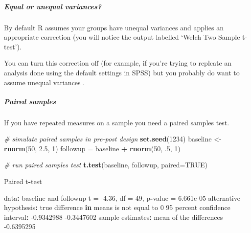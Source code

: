 \documentclass[]{article}
\newenvironment{Shaded}{\begin{snugshade}}{\end{snugshade}}
\newcommand{\CommentTok}[1]{\textcolor[rgb]{0.56,0.35,0.01}{\textit{#1}}}
\newcommand{\ControlFlowTok}[1]{\textcolor[rgb]{0.13,0.29,0.53}{\textbf{#1}}}
\newcommand{\DataTypeTok}[1]{\textcolor[rgb]{0.13,0.29,0.53}{#1}}
\newcommand{\DecValTok}[1]{\textcolor[rgb]{0.00,0.00,0.81}{#1}}
\newcommand{\FloatTok}[1]{\textcolor[rgb]{0.00,0.00,0.81}{#1}}
\newcommand{\KeywordTok}[1]{\textcolor[rgb]{0.13,0.29,0.53}{\textbf{#1}}}
\newcommand{\NormalTok}[1]{#1}
\newcommand{\OperatorTok}[1]{\textcolor[rgb]{0.81,0.36,0.00}{\textbf{#1}}}
\newcommand{\OtherTok}[1]{\textcolor[rgb]{0.56,0.35,0.01}{#1}}
\newcommand{\StringTok}[1]{\textcolor[rgb]{0.31,0.60,0.02}{#1}}
\let\oldsubparagraph\subparagraph
\renewcommand{\subparagraph}[1]{\oldsubparagraph{#1}\mbox{}}
\begin{document}
\hypertarget{equal-variances}{%
\subparagraph{Equal or unequal variances?}\label{equal-variances}}

By default R assumes your groups have unequal variances and applies an
appropriate correction (you will notice the output labelled `Welch Two Sample
t-test').

You can turn this correction off (for example, if you're trying to replcate an
analysis done using the default settings in SPSS) but you probably do want to
assume unequal variances \citep[see][]{ruxton2006unequal}.

\hypertarget{paired-samples}{%
\subparagraph{Paired samples}\label{paired-samples}}

If you have repeated measures on a sample you need a paired samples test.

\begin{Shaded}
\begin{Highlighting}[]
\CommentTok{# simulate paired samples in pre-post design}
\KeywordTok{set.seed}\NormalTok{(}\DecValTok{1234}\NormalTok{)}
\NormalTok{baseline <-}\StringTok{ }\KeywordTok{rnorm}\NormalTok{(}\DecValTok{50}\NormalTok{, }\FloatTok{2.5}\NormalTok{, }\DecValTok{1}\NormalTok{)}
\NormalTok{followup =}\StringTok{ }\NormalTok{baseline }\OperatorTok{+}\StringTok{ }\KeywordTok{rnorm}\NormalTok{(}\DecValTok{50}\NormalTok{, }\FloatTok{.5}\NormalTok{, }\DecValTok{1}\NormalTok{)}

\CommentTok{# run paired samples test}
\KeywordTok{t.test}\NormalTok{(baseline, followup, }\DataTypeTok{paired=}\OtherTok{TRUE}\NormalTok{)}

\NormalTok{    Paired t}\OperatorTok{-}\NormalTok{test}

\NormalTok{data}\OperatorTok{:}\StringTok{  }\NormalTok{baseline and followup}
\NormalTok{t =}\StringTok{ }\FloatTok{-4.36}\NormalTok{, df =}\StringTok{ }\DecValTok{49}\NormalTok{, p}\OperatorTok{-}\NormalTok{value =}\StringTok{ }\FloatTok{6.661e-05}
\NormalTok{alternative hypothesis}\OperatorTok{:}\StringTok{ }\NormalTok{true difference }\ControlFlowTok{in}\NormalTok{ means is not equal to }\DecValTok{0}
\DecValTok{95}\NormalTok{ percent confidence interval}\OperatorTok{:}
\StringTok{ }\FloatTok{-0.9342988} \FloatTok{-0.3447602}
\NormalTok{sample estimates}\OperatorTok{:}
\NormalTok{mean of the differences }
             \FloatTok{-0.6395295} 
\end{Highlighting}
\end{Shaded}
\end{document}
